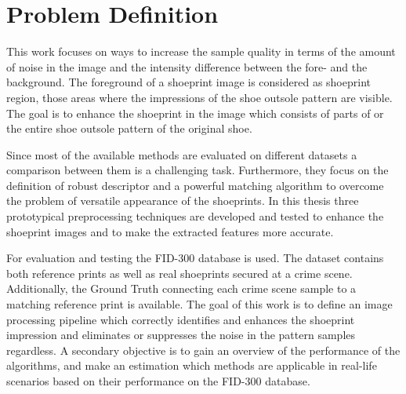 \documentclass[draft,final]{vutinfth} %
\begin{document}
\section{Problem Definition}
\par
This work focuses on ways to increase the sample quality in terms of the amount of noise in the image and the intensity difference between the fore- and the background.
The foreground of a shoeprint image is considered as shoeprint region, those areas where the impressions of the shoe outsole pattern are visible.
The goal is to enhance the shoeprint in the image which consists of parts of or the entire shoe outsole pattern of the original shoe.   
\par
Since most of the available methods are evaluated on different datasets a comparison between them is a challenging task.
Furthermore, they focus on the definition of robust descriptor and a powerful matching algorithm to overcome the problem of versatile appearance of the shoeprints.
In this thesis three prototypical preprocessing techniques are developed and tested to enhance the shoeprint images and to make the extracted features more accurate. 
\par
For evaluation and testing the FID-300 database is used.
The dataset contains both reference prints as well as real shoeprints secured at a crime scene.
Additionally, the Ground Truth connecting each crime scene sample to a matching reference print is available.
The goal of this work is to define an image processing pipeline which correctly identifies and enhances the shoeprint impression and eliminates or suppresses the noise in the pattern samples regardless.
A secondary objective is to gain an overview of the performance of the algorithms, and make an estimation which methods are applicable in real-life scenarios based on their performance on the FID-300 database. 

\end{document}
